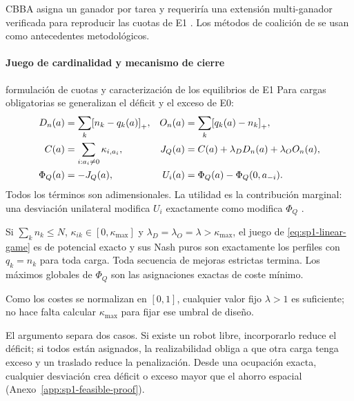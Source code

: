 CBBA asigna un ganador por tarea y requeriría una extensión multi-ganador verificada para reproducir las cuotas de E1 \parencite{choiBrunetHow2009CBBA}. Los métodos de coalición de \textcite{shehoryKraus1998Coalition,vigAdams2006Coalition} se usan como antecedentes metodológicos.

\paragraph{Juego de cardinalidad y mecanismo de cierre}

\begin{contribucion}{formulación de cuotas y caracterización de los equilibrios de E1}
Para cargas obligatorias se generalizan el déficit y el exceso de E0:
\begin{equation}
\begin{aligned}
 D_n(a)&=\sum_k\mathopen{\textnormal{[}}n_k-q_k(a)\mathclose{\textnormal{]}}_{+}, &
 O_n(a)&=\sum_k\mathopen{\textnormal{[}}q_k(a)-n_k\mathclose{\textnormal{]}}_{+},\\
 C(a)&=\sum_{i:a_i\neq0}\kappa_{i,a_i}, &
 J_Q(a)&=C(a)+\lambda_DD_n(a)+\lambda_OO_n(a),\\
 \Phi_Q(a)&=-J_Q(a), &
 U_i(a)&=\Phi_Q(a)-\Phi_Q(0,a_{-i}).
\end{aligned}
\label{eq:sp1-linear-game}
\end{equation}
Todos los términos son adimensionales. La utilidad es la contribución marginal: una desviación unilateral modifica $U_i$ exactamente como modifica $\Phi_Q$ \parencite{monderer1996potential}.

\begin{proposicion}
\label{thm:sp1-feasible-nash}
Si $\sum_kn_k\leq N$, $\kappa_{ik}\in[0,\kappa_{\max}]$ y $\lambda_D=\lambda_O=\lambda>\kappa_{\max}$, el juego de \eqref{eq:sp1-linear-game} es de potencial exacto y sus Nash puros son exactamente los perfiles con $q_k=n_k$ para toda carga. Toda secuencia de mejoras estrictas termina. Los máximos globales de $\Phi_Q$ son las asignaciones exactas de coste mínimo.
\end{proposicion}
Como los costes se normalizan en $[0,1]$, cualquier valor fijo $\lambda>1$ es suficiente; no hace falta calcular $\kappa_{\max}$ para fijar ese umbral de diseño.
\end{contribucion}
El argumento separa dos casos. Si existe un robot libre, incorporarlo reduce el déficit; si todos están asignados, la realizabilidad obliga a que otra carga tenga exceso y un traslado reduce la penalización. Desde una ocupación exacta, cualquier desviación crea déficit o exceso mayor que el ahorro espacial (Anexo~\ref{app:sp1-feasible-proof}).


